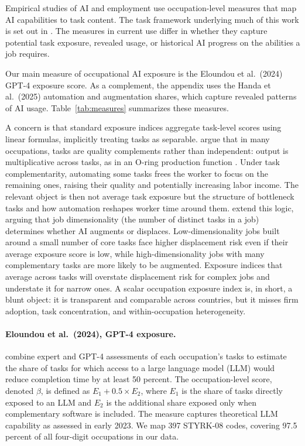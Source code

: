\documentclass[12pt]{article}
\begin{document}
Empirical studies of AI and employment use occupation-level measures that map AI capabilities to task content. The task framework underlying much of this work is set out in \citep{autor2003skill, acemoglu2011, acemoglu2018race, acemoglu2019automation}. The measures in current use differ in whether they capture potential task exposure, revealed usage, or historical AI progress on the abilities a job requires.

Our main measure of occupational AI exposure is the Eloundou et al.\ (2024) GPT-4 exposure score. As a complement, the appendix uses the Handa et al.\ (2025) automation and augmentation shares, which capture revealed patterns of AI usage. Table~\ref{tab:measures} summarizes these measures.

A concern is that standard exposure indices aggregate task-level scores using linear formulas, implicitly treating tasks as separable. \cite{gans2025} argue that in many occupations, tasks are quality complements rather than independent: output is multiplicative across tasks, as in an O-ring production function \citep{kremer1993}. Under task complementarity, automating some tasks frees the worker to focus on the remaining ones, raising their quality and potentially increasing labor income. The relevant object is then not average task exposure but the structure of bottleneck tasks and how automation reshapes worker time around them. \cite{imas2026} extend this logic, arguing that job dimensionality (the number of distinct tasks in a job) determines whether AI augments or displaces. Low-dimensionality jobs built around a small number of core tasks face higher displacement risk even if their average exposure score is low, while high-dimensionality jobs with many complementary tasks are more likely to be augmented. Exposure indices that average across tasks will overstate displacement risk for complex jobs and understate it for narrow ones. A scalar occupation exposure index is, in short, a blunt object: it is transparent and comparable across countries, but it misses firm adoption, task concentration, and within-occupation heterogeneity.


\paragraph{Eloundou et al.\ (2024), GPT-4 exposure.} \citet{eloundou2024} combine expert and GPT-4 assessments of each occupation's tasks to estimate the share of tasks for which access to a large language model (LLM) would reduce completion time by at least 50 percent. The occupation-level score, denoted $\beta$, is defined as $E_1 + 0.5 \times E_2$, where $E_1$ is the share of tasks directly exposed to an LLM and $E_2$ is the additional share exposed only when complementary software is included. The measure captures theoretical LLM capability as assessed in early 2023. We map 397 STYRK-08 codes, covering 97.5 percent of all four-digit occupations in our data.
\end{document}
